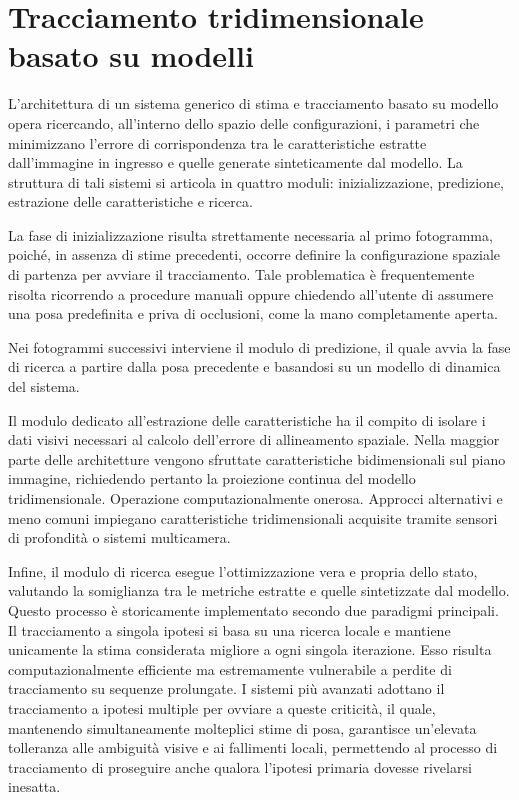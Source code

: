 \section{Tracciamento tridimensionale basato su modelli}

L'architettura di un sistema generico di stima e tracciamento basato su modello opera ricercando, all'interno dello spazio delle configurazioni, i parametri che minimizzano l'errore di corrispondenza tra le caratteristiche estratte dall'immagine in ingresso e quelle generate sinteticamente dal modello.
La struttura di tali sistemi si articola in quattro moduli: inizializzazione, predizione, estrazione delle caratteristiche e ricerca.

La fase di inizializzazione risulta strettamente necessaria al primo fotogramma, poiché, in assenza di stime precedenti, occorre definire la configurazione spaziale di partenza per avviare il tracciamento.
Tale problematica è frequentemente risolta ricorrendo a procedure manuali oppure chiedendo all'utente di assumere una posa predefinita e priva di occlusioni, come la mano completamente aperta.

Nei fotogrammi successivi interviene il modulo di predizione, il quale avvia la fase di ricerca a partire dalla posa precedente e basandosi su un modello di dinamica del sistema.

Il modulo dedicato all'estrazione delle caratteristiche ha il compito di isolare i dati visivi necessari al calcolo dell'errore di allineamento spaziale.
Nella maggior parte delle architetture vengono sfruttate caratteristiche bidimensionali sul piano immagine, richiedendo pertanto la proiezione continua del modello tridimensionale. Operazione computazionalmente onerosa.
Approcci alternativi e meno comuni impiegano caratteristiche tridimensionali acquisite tramite sensori di profondità o sistemi multicamera.

Infine, il modulo di ricerca esegue l'ottimizzazione vera e propria dello stato, valutando la somiglianza tra le metriche estratte e quelle sintetizzate dal modello.
Questo processo è storicamente implementato secondo due paradigmi principali. 
Il tracciamento a singola ipotesi si basa su una ricerca locale e mantiene unicamente la stima considerata migliore a ogni singola iterazione.
Esso risulta computazionalmente efficiente ma estremamente vulnerabile a perdite di tracciamento su sequenze prolungate.
I sistemi più avanzati adottano il tracciamento a ipotesi multiple per ovviare a queste criticità, il quale, mantenendo simultaneamente molteplici stime di posa, garantisce un'elevata tolleranza alle ambiguità visive e ai fallimenti locali, permettendo al processo di tracciamento di proseguire anche qualora l'ipotesi primaria dovesse rivelarsi inesatta.


